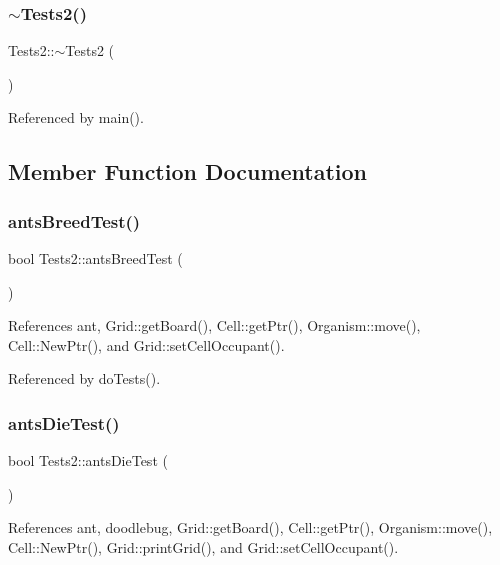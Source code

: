 \mbox{\label{classTests2_abed1a850ef511b7c06ae418cb3bbd5d9}} 
\subsubsection{$\sim$\+Tests2()}
{\footnotesize\ttfamily Tests2\+::$\sim$\+Tests2 (\begin{DoxyParamCaption}{ }\end{DoxyParamCaption})\hspace{0.3cm}{\ttfamily [virtual]}}



Referenced by main().



\subsection{Member Function Documentation}
\mbox{\label{classTests2_a21e7692afbdfb694caf370670cbeb7d4}} 
\subsubsection{ants\+Breed\+Test()}
{\footnotesize\ttfamily bool Tests2\+::ants\+Breed\+Test (\begin{DoxyParamCaption}{ }\end{DoxyParamCaption})}



References ant, Grid\+::get\+Board(), Cell\+::get\+Ptr(), Organism\+::move(), Cell\+::\+New\+Ptr(), and Grid\+::set\+Cell\+Occupant().



Referenced by do\+Tests().

\mbox{\label{classTests2_a045d58417814d72bcf4c97b2ebb51461}} 
\subsubsection{ants\+Die\+Test()}
{\footnotesize\ttfamily bool Tests2\+::ants\+Die\+Test (\begin{DoxyParamCaption}{ }\end{DoxyParamCaption})}



References ant, doodlebug, Grid\+::get\+Board(), Cell\+::get\+Ptr(), Organism\+::move(), Cell\+::\+New\+Ptr(), Grid\+::print\+Grid(), and Grid\+::set\+Cell\+Occupant().



